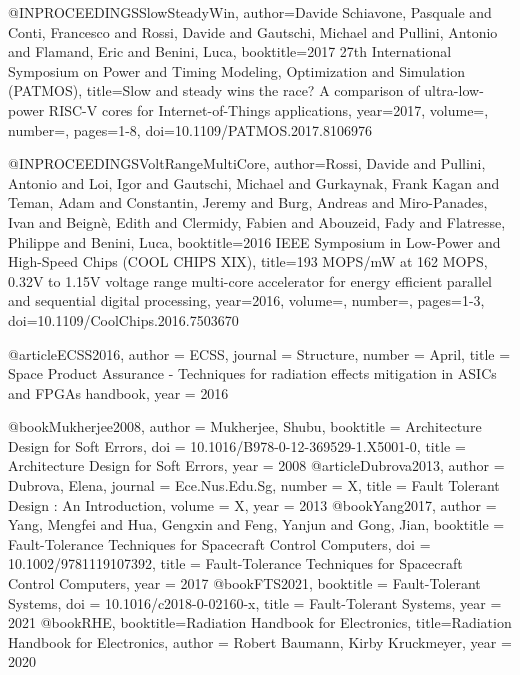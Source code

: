 @INPROCEEDINGS{SlowSteadyWin,  
    author={Davide Schiavone, Pasquale and Conti, Francesco and Rossi, Davide and Gautschi, Michael and Pullini, Antonio and Flamand, Eric and Benini, Luca},  booktitle={2017 27th International Symposium on Power and Timing Modeling, Optimization and Simulation (PATMOS)},
    title={Slow and steady wins the race? A comparison of ultra-low-power RISC-V cores for Internet-of-Things applications},
    year={2017},
    volume={},
    number={},
    pages={1-8},
    doi={10.1109/PATMOS.2017.8106976}
}


@INPROCEEDINGS{VoltRangeMultiCore,
    author={Rossi, Davide and Pullini, Antonio and Loi, Igor and Gautschi, Michael and Gurkaynak, Frank Kagan and Teman, Adam and Constantin, Jeremy and Burg, Andreas and Miro-Panades, Ivan and Beignè, Edith and Clermidy, Fabien and Abouzeid, Fady and Flatresse, Philippe and Benini, Luca},
    booktitle={2016 IEEE Symposium in Low-Power and High-Speed Chips (COOL CHIPS XIX)}, 
    title={193 MOPS/mW at 162 MOPS, 0.32V to 1.15V voltage range multi-core accelerator for energy efficient parallel and sequential digital processing}, 
    year={2016},
    volume={},
    number={},
    pages={1-3},
    doi={10.1109/CoolChips.2016.7503670}
}


@article{ECSS2016,
	author = {ECSS},
	journal = {Structure},
	number = {April},
	title = {{Space Product Assurance - Techniques for radiation effects mitigation in ASICs and FPGAs handbook}},
	year = {2016}
}



@book{Mukherjee2008,
	author = {Mukherjee, Shubu},
	booktitle = {Architecture Design for Soft Errors},
	doi = {10.1016/B978-0-12-369529-1.X5001-0},
	title = {{Architecture Design for Soft Errors}},
	year = {2008}
}
@article{Dubrova2013,
	author = {Dubrova, Elena},
	journal = {Ece.Nus.Edu.Sg},
	number = {X},
	title = {{Fault Tolerant Design : An Introduction}},
	volume = {X},
	year = {2013}
}
@book{Yang2017,
	author = {Yang, Mengfei and Hua, Gengxin and Feng, Yanjun and Gong, Jian},
	booktitle = {Fault-Tolerance Techniques for Spacecraft Control Computers},
	doi = {10.1002/9781119107392},
	title = {{Fault-Tolerance Techniques for Spacecraft Control Computers}},
	year = {2017}
}
@book{FTS2021,
	booktitle = {Fault-Tolerant Systems},
	doi = {10.1016/c2018-0-02160-x},
	title = {{Fault-Tolerant Systems}},
	year = {2021}
}
@book{RHE,
	booktitle={Radiation Handbook for Electronics},
	title={Radiation Handbook for Electronics},
	author = {Robert Baumann, Kirby Kruckmeyer},
	year = {2020}
}




